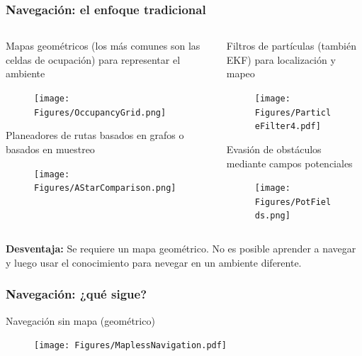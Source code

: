 \begin{frame}\frametitle{Navegación: el enfoque tradicional}
  \begin{columns}
    \begin{column}{0.5\textwidth}
      Mapas geométricos (los más comunes son las celdas de ocupación) para representar el ambiente
      \begin{figure}
        \centering
        \texttt{[image: Figures/OccupancyGrid.png]}
      \end{figure}
      Planeadores de rutas basados en grafos o basados en muestreo
      \begin{figure}
        \centering
        \texttt{[image: Figures/AStarComparison.png]}
      \end{figure}
    \end{column}
    \begin{column}{0.5\textwidth}
      Filtros de partículas (también EKF) para localización y mapeo
      \begin{figure}
        \centering
        \texttt{[image: Figures/ParticleFilter4.pdf]}
      \end{figure}
      Evasión de obstáculos mediante campos potenciales
      \begin{figure}
        \centering
        \texttt{[image: Figures/PotFields.png]}
      \end{figure}
    \end{column}
  \end{columns}
  \textbf{Desventaja:} Se requiere un mapa geométrico. No es posible aprender a navegar y luego usar el conocimiento para nevegar en un ambiente diferente. 
\end{frame}

\begin{frame}\frametitle{Navegación: ¿qué sigue?}
  Navegación sin mapa (geométrico)
  \begin{figure}
    \centering
    \texttt{[image: Figures/MaplessNavigation.pdf]}
  \end{figure}
\end{frame}


